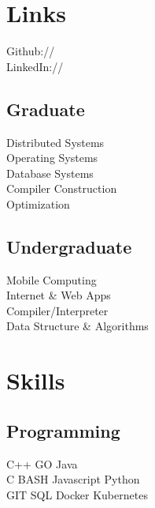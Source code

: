 \documentclass[]{deedy-resume-openfont}
\begin{document}
\begin{minipage}[t]{0.30\textwidth}
\section{Links} 
Github:// \href{https://github.com/sh-ankur/}{} \\
LinkedIn://  \href{https://www.linkedin.com/in/shankur}{} \\
\sectionsep


\subsection{Graduate}
Distributed Systems \\
Operating Systems \\
Database Systems\\
Compiler Construction \\
Optimization \\
\sectionsep

\subsection{Undergraduate}
Mobile Computing \\
Internet \& Web Apps \\
Compiler/Interpreter\\
Data Structure \& Algorithms\\
\sectionsep


\section{Skills}
\subsection{Programming}
C++ \textbullet{}   GO \textbullet{} Java \\
C \textbullet{} BASH \textbullet{} Javascript \textbullet{} Python \\
GIT \textbullet{} SQL \textbullet{} Docker \textbullet{} Kubernetes
\sectionsep



\end{minipage}
\end{document}
